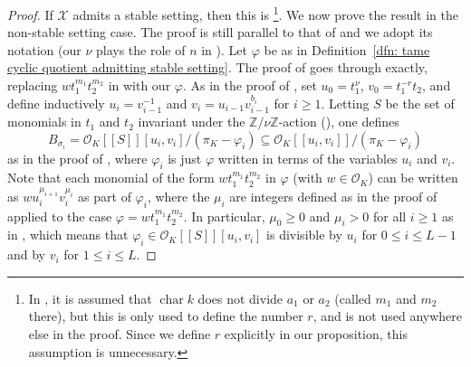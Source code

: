 \documentclass[12pt]{amsart}
\numberwithin{equation}{section}
\theoremstyle{definition}
\newcommand{\mc}[1]{\mathcal{#1}}
\newcommand{\ints}{\mathbb Z}
\renewcommand{\phi}{\varphi}
\DeclareMathOperator{\cha}{char}
\begin{document}
\begin{proof}
   If $\mc{X}$ admits a stable setting, then this is
\cite[Proposition~4.4.2.5]{HN}\footnote{In \cite{HN}, it is assumed
  that $\cha{k}$ does not divide $a_1$ or $a_2$ (called $m_1$ and
  $m_2$ there), but this is only used to define the number $r$, and is
  not used anywhere else in the proof.  Since we define $r$ explicitly
  in our proposition, this assumption is unnecessary.}.
We now prove the result in the
non-stable setting case.
The proof is still
parallel to that of \cite[Proposition~4.4.2.5]{HN} and we adopt its
notation (our $\nu$ plays the role of $n$ in \cite{HN}).  Let $\phi$ be as in
 Definition~\ref{dfn: tame cyclic quotient admitting stable setting}.  The proof of
\cite[Lemma~4.4.2.2]{HN} goes through exactly, replacing
$wt_1^{m_1}t_2^{m_2}$ in \cite{HN} with our $\phi$. As in the proof of \cite[Proposition~4.4.2.5]{HN}, set $u_0 = t_1^{\nu}$, $v_0 =
t_1^{-r}t_2$, and define inductively $u_i = v_{i-1}^{-1}$ and $v_i =
u_{i-1}v_{i-1}^{b_i}$ for $i \geq 1$. 
Letting $S$ be the set of monomials in $t_1$ and $t_2$ invariant under
the $\ints/\nu \ints$-action (\cite[Lemma~4.4.2.2]{HN}), one defines 
$$B_{\sigma_i} = \mc{O}_K[[S]][u_i, v_i]/(\pi_K - \phi_i)
\subseteq \mc{O}_K[[u_i, v_i]]/(\pi_K - \phi_i)$$ as
in the proof of \cite[Proposition~4.4.2.5]{HN}, 
where $\phi_i$ is just $\phi$ written in terms of the variables
$u_i$ and $v_i$.  Note that each monomial of the form
$wt_1^{m_1}t_2^{m_2}$ in $\phi$ (with $w \in \mc{O}_K$) can be written as
$wu_i^{\mu_{i+1}}v_i^{\mu_i}$ as part of $\phi_i$, where the $\mu_i$ are integers defined as in the
proof of \cite[Proposition~4.4.2.5]{HN} applied to the case $\phi =
wt_1^{m_1}t_2^{m_2}$.  In particular, $\mu_0 \geq 0$ and $\mu_i > 0$ for all $i \geq 1$
as in \cite{HN}, which means that $\phi_i \in \mc{O}_K[[S]][u_i, v_i]$ is
divisible by
$u_i$ for $0 \leq i \leq L-1$ and by $v_i$ for $1 \leq i \leq L$.  


\end{proof}
\end{document}

